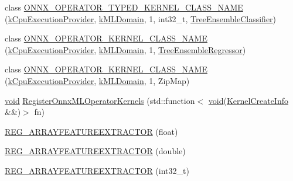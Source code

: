 \begin{DoxyCompactItemize}
\item 
class \mbox{\hyperlink{namespaceonnxruntime_1_1ml_af444341429f6802a1a20f9e54cf2f4aa}{O\+N\+N\+X\+\_\+\+O\+P\+E\+R\+A\+T\+O\+R\+\_\+\+T\+Y\+P\+E\+D\+\_\+\+K\+E\+R\+N\+E\+L\+\_\+\+C\+L\+A\+S\+S\+\_\+\+N\+A\+ME}} (\mbox{\hyperlink{namespaceonnxruntime_a394a3c7e50622de1f203a96df592060d}{k\+Cpu\+Execution\+Provider}}, \mbox{\hyperlink{namespaceonnxruntime_a76df7dd63759039fc62486d6691e70e5}{k\+M\+L\+Domain}}, 1, int32\+\_\+t, \mbox{\hyperlink{classonnxruntime_1_1ml_1_1TreeEnsembleClassifier}{Tree\+Ensemble\+Classifier}})
\item 
class \mbox{\hyperlink{namespaceonnxruntime_1_1ml_ad6ca832e117319817cdf8851ed76a9db}{O\+N\+N\+X\+\_\+\+O\+P\+E\+R\+A\+T\+O\+R\+\_\+\+K\+E\+R\+N\+E\+L\+\_\+\+C\+L\+A\+S\+S\+\_\+\+N\+A\+ME}} (\mbox{\hyperlink{namespaceonnxruntime_a394a3c7e50622de1f203a96df592060d}{k\+Cpu\+Execution\+Provider}}, \mbox{\hyperlink{namespaceonnxruntime_a76df7dd63759039fc62486d6691e70e5}{k\+M\+L\+Domain}}, 1, \mbox{\hyperlink{classonnxruntime_1_1ml_1_1TreeEnsembleRegressor}{Tree\+Ensemble\+Regressor}})
\item 
class \mbox{\hyperlink{namespaceonnxruntime_1_1ml_a4cf257b56f29c3bfc7e979a135a5500f}{O\+N\+N\+X\+\_\+\+O\+P\+E\+R\+A\+T\+O\+R\+\_\+\+K\+E\+R\+N\+E\+L\+\_\+\+C\+L\+A\+S\+S\+\_\+\+N\+A\+ME}} (\mbox{\hyperlink{namespaceonnxruntime_a394a3c7e50622de1f203a96df592060d}{k\+Cpu\+Execution\+Provider}}, \mbox{\hyperlink{namespaceonnxruntime_a76df7dd63759039fc62486d6691e70e5}{k\+M\+L\+Domain}}, 1, Zip\+Map)
\item 
\mbox{\hyperlink{mlasi_8h_a88f941d423cb2a819b70a1358982b1a6}{void}} \mbox{\hyperlink{namespaceonnxruntime_1_1ml_a33e2946a334cfd6342a084f9cc1b1f93}{Register\+Onnx\+M\+L\+Operator\+Kernels}} (std\+::function$<$ \mbox{\hyperlink{mlasi_8h_a88f941d423cb2a819b70a1358982b1a6}{void}}(\mbox{\hyperlink{structonnxruntime_1_1KernelCreateInfo}{Kernel\+Create\+Info}} \&\&)$>$ fn)
\item 
\mbox{\hyperlink{namespaceonnxruntime_1_1ml_a70dd6b78edc4fb459a0602ba49a68274}{R\+E\+G\+\_\+\+A\+R\+R\+A\+Y\+F\+E\+A\+T\+U\+R\+E\+E\+X\+T\+R\+A\+C\+T\+OR}} (float)
\item 
\mbox{\hyperlink{namespaceonnxruntime_1_1ml_aa98449b4e73b0f444a351f7382d08535}{R\+E\+G\+\_\+\+A\+R\+R\+A\+Y\+F\+E\+A\+T\+U\+R\+E\+E\+X\+T\+R\+A\+C\+T\+OR}} (double)
\item 
\mbox{\hyperlink{namespaceonnxruntime_1_1ml_a1445f2c0810e98dc4b62df89d69a2517}{R\+E\+G\+\_\+\+A\+R\+R\+A\+Y\+F\+E\+A\+T\+U\+R\+E\+E\+X\+T\+R\+A\+C\+T\+OR}} (int32\+\_\+t)

\end{DoxyCompactItemize}
